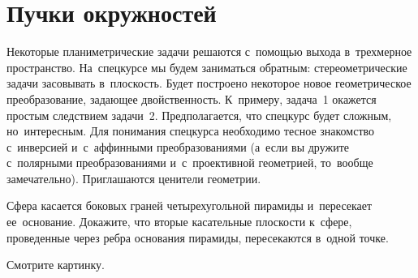 
\section*{Пучки окружностей}



Некоторые планиметрические задачи решаются с~помощью выхода в~трехмерное
пространство.
На~спецкурсе мы будем заниматься обратным: стереометрические задачи засовывать
в~плоскость.
Будет построено некоторое новое геометрическое преобразование, задающее
двойственность.
К~примеру, задача~1 окажется простым следствием задачи~2.
Предполагается, что спецкурс будет сложным, но~интересным.
Для понимания спецкурса необходимо тесное знакомство с~инверсией и~с~аффинными
преобразованиями (а~если вы дружите с~полярными преобразованиями
и~с~проективной геометрией, то~вообще замечательно).
Приглашаются ценители геометрии.

\begingroup
\ifx\problemfigurewidth\undefined
\newlength\problemfigurewidth
\newlength\problemtextwidth
\newlength\problemspacewidth
\fi
\setlength\problemfigurewidth{3cm}
\setlength\problemspacewidth{1em}
\setlength\problemtextwidth{\linewidth}
\addtolength\problemtextwidth{-\problemfigurewidth}
\addtolength\problemtextwidth{-\problemspacewidth}
\begin{minipage}[b]{\problemtextwidth}
Сфера касается боковых граней четырехугольной пирамиды и~пересекает
ее~основание.
Докажите, что вторые касательные плоскости к~сфере, проведенные через ребра
основания пирамиды, пересекаются в~одной точке.
\par\vspace{1ex}
Смотрите картинку.
\end{minipage}\hspace{\problemspacewidth}%
\begin{minipage}[b]{\problemfigurewidth}
\end{minipage}
\endgroup


